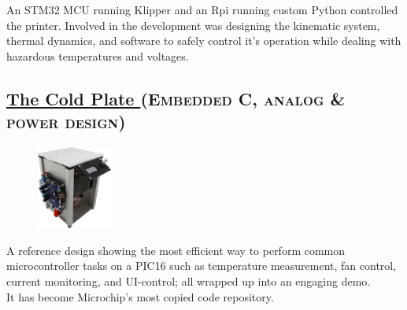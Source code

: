 \documentclass[
	10pt, %
]{FreemanCV}
\begin{document}
\begin{paracol}{2}
An STM32 MCU running Klipper and an Rpi running custom Python controlled the printer.
Involved in the development was designing the kinematic system, thermal dynamics, and software to safely control it's operation
while dealing with hazardous temperatures and voltages.

\vspace*{-10pt}
\leavevmode \subsection{\href{https://github.com/microchip-pic-avr-examples/pic16f17146-cold-plate-mplab-mcc}{The Cold Plate \linkcolor\scriptsize\faLink}
\hfill
\textsc{\footnotesize{(Embedded C, analog \& power design)}}}

\setlength\intextsep{0pt} %
\begin{figure} %
	\hspace*{-5pt} %
    \includegraphics[width=70pt]{cold_plate} %
\end{figure}


A reference design showing the most efficient way to perform common microcontroller tasks on a PIC16
such as temperature measurement, fan control, current monitoring, and UI-control;
all wrapped up into an engaging demo.\\

It has become Microchip's most copied code repository.

\end{paracol}



\end{document}
